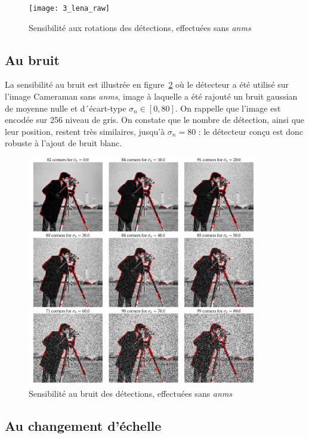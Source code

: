 \documentclass[12pt,a4paper,onecolumn]{article}
\begin{document}
\begin{figure}[H]
	\centering
	\texttt{[image: 3\_lena\_raw]}
	\caption{Sensibilité aux rotations des détections, effectuées sans \textit{anms}}
	\label{fig_3_rot_lena_raw}
\end{figure}

\subsection{Au bruit}

La sensibilité au bruit est illustrée en figure~\ref{fig_3_noise_cameraman_raw} où le détecteur a été utilisé sur l'image Cameraman sans \textit{anms}, image à laquelle a été rajouté un bruit gaussian de moyenne nulle et d´écart-type \(\sigma_n \in [0, 80]\). On rappelle que l'image est encodée sur 256 niveau de gris. On constate que le nombre de détection, ainsi que leur position, restent très similaires, jusqu'à \(\sigma_n = 80\) : le détecteur conçu est donc robuste à l'ajout de bruit blanc.

\begin{figure}[H]
	\centering
	\includegraphics[width = 0.9\textwidth]{3_cameraman_raw}
	\caption{Sensibilité au bruit des détections, effectuées sans \textit{anms}}
	\label{fig_3_noise_cameraman_raw}
\end{figure}


\subsection{Au changement d'échelle}
\end{document}

